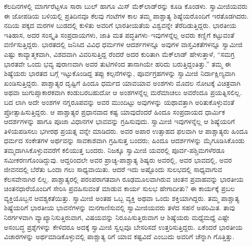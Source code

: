 ಕೆಲದಿನಗಳಲ್ಲಿ ಮಾರ್ಗರೆಟ್ಟಳೂ ಸಾರಾ ಬುಲ್ ಹಾಗೂ ಮಿಸ್ ಮೆಕ್​ಲಾಡ್​ರನ್ನು ಕೂಡಿ ಕೊಂಡಳು. ಸ್ವಾಮೀಜಿಯವರು ಈ ಜೋಪಡಿಯ ಬಳಿಯಲ್ಲಿ ಪ್ರತಿದಿನವೂ ಕೆಲವು ಗಂಟೆಗಳ ಕಾಲ ತಮ್ಮ ಪಾಶ್ಚಾತ್ಯ ಶಿಷ್ಯೆಯರೊಂದಿಗೆ ಇರತೊಡಗಿದರು. ನದಿಯ ಪಕ್ಕದ ಮರಗಳ ಬುಡದಲ್ಲಿ ಕುಳಿತು ಅವರಿಗೆ ಭಾರತೀಯತೆಯ ವಿಶ್ವವನ್ನೇ ತೆರೆದಿಡುತ್ತಿದ್ದರು. ಭಾರತೀಯ ಇತಿಹಾಸ, ಅದರ ಸಂಸ್ಕೃತಿ ಸಂಪ್ರದಾಯಗಳು, ಜಾತಿ ಮತ ಪದ್ಧತಿಗಳು–ಇವುಗಳನ್ನೆಲ್ಲ ಅವರು ಕಣ್ಣಿಗೆ ಕಟ್ಟುವಂತೆ ವರ್ಣಿಸುತ್ತಿದ್ದರು. ಭಾರತದಲ್ಲಿ ಜನಿಸಿದ ವಿವಿಧ ಧರ್ಮಗಳ ಆದರ್ಶಗಳನ್ನೂ ಅವುಗಳ ವಾಸ್ತವಿಕತೆಗಳನ್ನೂ ಸ್ವಾಮೀಜಿ ಎಷ್ಟು ಕಾವ್ಯಾತ್ಮಕವಾಗಿ, ವಿಶದವಾಗಿ ವಿವರಿಸುತ್ತಿದ್ದ ರೆಂದರೆ ಅದರ ಕುರಿತಾಗಿ ಮೆಕ್​ಲಾಡ್ ಹೇಳುತ್ತಾಳೆ, “ಸಮಗ್ರ ಭಾರತವೇ ಒಂದು ಭವ್ಯ ಪುರಾಣವಾಗಿ ಅವರ ತುಟಿಗಳಿಂದ ತಾನಾಗಿಯೇ ಹರಿದು ಬರುತ್ತಿದ್ದಂತಿತ್ತು.” ತಮ್ಮ ಈ ಶಿಷ್ಯೆಯರು ಭಾರತದ ಬಗ್ಗೆ ಇಟ್ಟುಕೊಂಡಿದ್ದ ತಪ್ಪು ಕಲ್ಪನೆಗಳನ್ನು, ಪೂರ್ವಗ್ರಹಗಳನ್ನು ಸ್ವಾಮೀಜಿ ನಿರ್ದಾಕ್ಷಿಣ್ಯವಾಗಿ ಖಂಡಿಸುತ್ತಿದ್ದರು. ಪಾಶ್ಚಾತ್ಯರ ದೃಷ್ಟಿಗೆ ಹಿಂದೂ ಧರ್ಮದ ಯಾವಯಾವ ಅಂಶಗಳು ಮೊದಲ ನೋಟಕ್ಕೆ ವಿಚಿತ್ರವಾಗಿ ಅಥವಾ ಜುಗುಪ್ಸಾಕಾರಕವಾಗಿ ಕಂಡುಬರಬಹುದೋ ಆ ಅಂಶಗಳನ್ನೆಲ್ಲ ಮರೆಮಾಚಲು ಅವರೆಂದೂ ಪ್ರಯತ್ನಿಸಲಿಲ್ಲ. ಬದ ಲಾಗಿ ಅದೇ ಅಂಶಗಳ ನಗ್ನರೂಪವನ್ನು ಅವರ ಮುಂದಿಟ್ಟು ಅವುಗಳನ್ನು ಯಥಾವತ್ತಾಗಿ ಅರಿತುಕೊಳ್ಳುವಂತೆ ಪ್ರೋತ್ಸಾಹಿಸುತ್ತಿದ್ದರು. ಆ ಪಾಶ್ಚಾತ್ಯರ ಪ್ರಧಾನವಾದ ಕಷ್ಟ ಯಾವುದೆಂದರೆ ಹಿಂದೂ ಸಂಪ್ರದಾಯದ ಧಾರ್ಮಿಕ ಆದರ್ಶಗಳನ್ನು ಹಾಗೂ ಪೂಜಾ ವಿಧಾನಗಳ ಭಾವವನ್ನು ಗ್ರಹಿಸುವುದು. ಸ್ವಾಮೀಜಿ ಇವುಗಳನ್ನೆಲ್ಲ ಆ ಶಿಷ್ಯೆಯರಿಗೆ ತಿಳಿಯಪಡಿಸಲು ಭಗೀರಥ ಪ್ರಯತ್ನ ವನ್ನೇ ಮಾಡಿದರು. ಅವರ ಅಪಾರ ಉತ್ಸಾಹದ ಫಲವಾಗಿ ಆ ಪಾಶ್ಚಾತ್ಯರು ಹಿಂದೂ ಧರ್ಮದ ಸಂಕೇತಗಳ ಅರ್ಥವನ್ನು ಸಾವಕಾಶವಾಗಿ ಗ್ರಹಿಸುತ್ತ ಬಂದರು; ಹಿಂದೂ ಆದರ್ಶಗಳನ್ನು ಮೈಗೂಡಿಸಿಕೊಂಡು ತಮ್ಮದಾಗಿಸಿಕೊಳ್ಳುವವರೆಗೆ ಕಲಿಯುತ್ತ ಬಂದರು. ನಿಜಕ್ಕೂ ಸ್ವಾಮೀಜಿ ಯವರಲ್ಲಿ ಪೂರ್ವ-ಪಶ್ಚಿಮಗಳೆರಡೂ ಸಮೀಕರಣಗೊಂಡಿದ್ದುವು. ಆದ್ದರಿಂದಲೇ ಅವರ ಪ್ರಾಚ್ಯ-ಪಾಶ್ಚಾತ್ಯ ಶಿಷ್ಯರು ಅವರಲ್ಲಿ, ಅವರ ಭಾವದಲ್ಲಿ, ಅವರ ಜೀವನದಲ್ಲಿ ಬೆರೆತು ಒಂದಾ ಗಲು ಸಾಧ್ಯವಾಯಿತು. ಆದರೆ ಇದು ಅಷ್ಟೊಂದು ಸುಲಭದಲ್ಲಿ ಸಾಧ್ಯವಾಗುವ ಕೆಲಸವೇನಾಗಿರ ಲಿಲ್ಲ. ಪಾಶ್ಚಾತ್ಯರಲ್ಲಿ ಪರಂಪರಾಗತವಾಗಿ ರೂಢಮೂಲವಾಗಿರುವ ಚಿಂತನ ಪ್ರವಾಹವನ್ನು ಭಾರತೀಯ ಚಿಂತನಧಾರೆಯೊಂದಿಗೆ ಸೇರಿಸಿ ಪ್ರವಹಿಸುವಂತೆ ಮಾಡುವ ಕಾರ್ಯ ಸುಲಭ ಹೇಗಾದೀತು? ಈ ಕಾರ್ಯಕ್ಕೆ ಪ್ರಬಲ ವ್ಯಕ್ತಿಯೊಬ್ಬನ ಆವಶ್ಯಕತೆಯಿತ್ತು. ಸ್ವಾಮೀಜಿ ಅಂತಹ ಒಬ್ಬ ವ್ಯಕ್ತಿ ಅಥವಾ ಒಂದು ಶಕ್ತಿಯಾಗಿದ್ದರು. ತಮ್ಮ ಪಾಶ್ಚಾತ್ಯ ಶಿಷ್ಯೆಯರಿಗೆ ಭಾರತೀಯ ಭಾವನೆಗಳನ್ನು ಮನಗಾಣಿಸುವಲ್ಲಿ ಸ್ವಾಮೀಜಿಯವರು ತಳೆದ ಸಹನೆ ಅಪರಿಮಿತ. ತಾವು ನಿರರ್ಗಳವಾಗಿ ವ್ಯಾಖ್ಯಾನಿಸುತ್ತಿರುವಾಗ, ವಿಷಯವನ್ನು ನಿರೂಪಿಸುತ್ತಿರುವಾಗ ಆ ಶಿಷ್ಯೆಯರು ಮಧ್ಯೆಮಧ್ಯೆ ಎಷ್ಟೇ ಅಸಂಬದ್ಧ ಪ್ರಶ್ನೆಗಳನ್ನು ಕೇಳಿದರೂ ಅದಕ್ಕೆ ಸ್ವಾಮೀಜಿ ಸ್ವಲ್ಪವೂ ಬೇಸರಿಸದೆ ಉತ್ತರಿಸುತ್ತಿದ್ದರು. ಏಕೆಂದರೆ ಭಾರತೀಯ ವಿಚಾರಗಳನ್ನು ಅರ್ಥಮಾಡಿಕೊಳ್ಳುವಲ್ಲಿ ಪಾಶ್ಚಾತ್ಯ ರಿಗೆ ಯಾವ ಕಷ್ಟವಿದೆ ಎಂಬುದು ಅವರಿಗೆ ಚೆನ್ನಾಗಿ ಗೊತ್ತಿತ್ತು.


